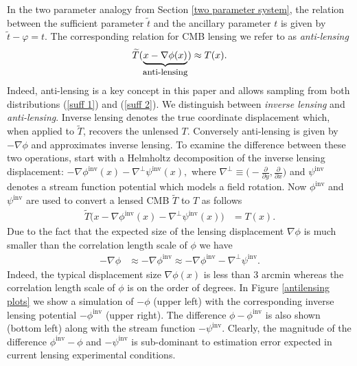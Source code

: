 \documentclass[noinfoline]{imsart}
\begin{document}
In the two parameter analogy from Section \ref{two parameter system},  the relation between the sufficient parameter $\widetilde t$ and the ancillary parameter $t$ is given by $\widetilde t - \varphi = t$. The corresponding relation for CMB lensing we refer to as {\em anti-lensing}
\begin{equation}
\label{antilense}
 \widetilde T(\underbrace{x-\nabla\phi(x)}_\text{\small anti-lensing}) \approx T(x).%
\end{equation}
Indeed,  anti-lensing is a key concept in this paper and allows sampling from both distributions (\ref{suff 1}) and (\ref{suff 2}).
We distinguish between {\em inverse lensing} and  {\em anti-lensing}. Inverse lensing denotes the true coordinate displacement which, when applied to  $\widetilde T$, recovers the unlensed $T$. Conversely  anti-lensing is  given by $-\nabla\phi$ and approximates inverse lensing.  
To examine the difference between these two operations, start with a Helmholtz decomposition of the inverse lensing displacement: $-\nabla \phi^\text{inv}(x) - \nabla^\perp \psi^\text{inv}(x),$  where $\nabla^\perp \equiv \bigr(-\frac{\partial}{\partial y},\frac{\partial}{\partial x} \bigl)$ and  $\psi^\text{inv}$ denotes a stream function potential which models a field rotation. Now $\phi^\text{inv}$ and $\psi^\text{inv}$ are used to convert a lensed CMB $\widetilde T$ to $T$ as follows 
\begin{align*}
\widetilde T\bigl(x-\nabla \phi^\text{inv}(x) - \nabla^\perp \psi^\text{inv}(x)\bigr) &= T(x).
\end{align*}
Due to the fact that the expected size of the lensing displacement $\nabla\phi$ is much smaller than the correlation length scale of $\phi$ we have
\begin{align}
\label{anti approx}
-\nabla\phi &\approx -\nabla\phi^\text{inv} \approx -\nabla\phi^\text{inv}- \nabla^\perp \psi^\text{inv}.
\end{align}
Indeed, the typical displacement size $\nabla \phi(x)$ is less than 3 arcmin whereas the correlation length scale of $\phi$ is on the order of degrees. In Figure \ref{antilensing plots} we show a simulation of  $-\phi$ (upper left) with the corresponding inverse lensing potential $-\phi^\text{inv}$ (upper right). The difference $\phi - \phi^\text{inv}$ is also shown (bottom left) along with the stream function $-\psi^\text{inv}$. Clearly, the magnitude of the difference  $\phi^\text{inv}-\phi$ and $-\psi^\text{inv}$ is sub-dominant to estimation error expected in current lensing experimental conditions.
\end{document}
